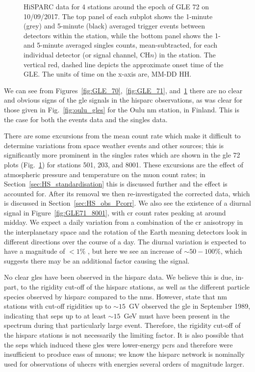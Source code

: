 \begin{figure}[ht!]
	\caption{HiSPARC data for 4 stations around the epoch of GLE 72 on 10/09/2017. The top panel of each subplot shows the 1-minute (grey) and 5-minute (black) averaged trigger events between detectors within the station, while the bottom panel shows the 1- and 5-minute averaged singles counts, mean-subtracted, for each individual detector (or signal channel, CH$n$) in the station. The vertical red, dashed line depicts the approximate onset time of the GLE. The units of time on the x-axis are, MM-DD HH.}
	\label{fig:GLE_72}
\end{figure}


We can see from Figures~\ref{fig:GLE_70},~\ref{fig:GLE_71}, and~\ref{fig:GLE_72} there are no clear and obvious signs of the \gls{gle} signals in the \gls{hisparc} observations, as was clear for those given in Fig.~\ref{fig:oulu_gles} for the Oulu \gls{nm} station, in Finland. This is the case for both the events data and the singles data.

There are some excursions from the mean count rate which make it difficult to determine variations from space weather events and other sources; this is significantly more prominent in the singles rates which are shown in the \gls{gle} 72 plots (Fig.~\ref{fig:GLE_72}) for stations 501, 203, and 8001. These excursions are the effect of atmospheric pressure and temperature on the muon count rates; in Section~\ref{sec:HS_standardisation} this is discussed further and the effect is accounted for. After its removal we then re-investigated the corrected data, which is discussed in Section~\ref{sec:HS_obs_Pcorr}. We also see the existence of a diurnal signal in Figure~\ref{fig:GLE71_8001}, with \gls{cr} count rates peaking at around midday. We expect a daily variation from a combination of the \gls{cr} anisotropy in the interplanetary space and the rotation of the Earth meaning detectors look in different directions over the course of a day. The diurnal variation is expected to have a magnitude of $<1\%$ \citep{mishra_study_2007, mishra_cosmic_2008, dubey_cosmic_2016, thomas_decadal_2017}, but here we see an increase of $\sim50-100\%$, which suggests there may be an additional factor causing the signal.

No clear \glspl{gle} have been observed in the \gls{hisparc} data. We believe this is due, in-part, to the rigidity cut-off of the \gls{hisparc} stations, as well as the different particle species observed by \gls{hisparc} compared to the \glspl{nm}. However, \citet{humble_j._e._detection_2012} state that \gls{nm} stations with cut-off rigidities up to $\sim 15$~GV observed the \gls{gle} in September 1989, indicating that \glspl{sep} up to at least $\sim 15$~GeV must have been present in the spectrum during that particularly large event. Therefore, the rigidity cut-off of the \gls{hisparc} stations is not necessarily the limiting factor. It is also possible that the \glspl{sep} which induced these \glspl{gle} were lower-energy \glspl{pcr} and therefore were insufficient to produce \glspl{eas} of muons; we know the \gls{hisparc} network is nominally used for observations of \glspl{uhecr} with energies several orders of magnitude larger.

